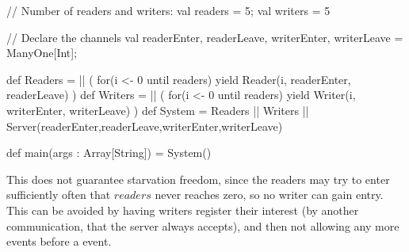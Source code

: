 \begin{nontuteanswer}
\begin{scala}[showstringspaces=false]
{  // Number of readers and writers:
  val readers = 5; val writers = 5

  // Declare the channels
  val readerEnter, readerLeave, writerEnter, writerLeave = ManyOne[Int];  

  def Readers = 
    || ( for(i <- 0 until readers) yield Reader(i, readerEnter, readerLeave) )
  def Writers =
    || ( for(i <- 0 until readers) yield Writer(i, writerEnter, writerLeave) )
  def System = 
    Readers || Writers || Server(readerEnter,readerLeave,writerEnter,writerLeave)

  def main(args : Array[String]) = { System() }
}
\end{scala}

This does not guarantee starvation freedom, since the readers may try to enter
sufficiently often that $readers$ never reaches zero, so no writer can gain
entry.  This can be avoided by having writers register their interest (by
another communication, that the server always accepts), and then not allowing
any more  events before a  event.
\end{nontuteanswer}


